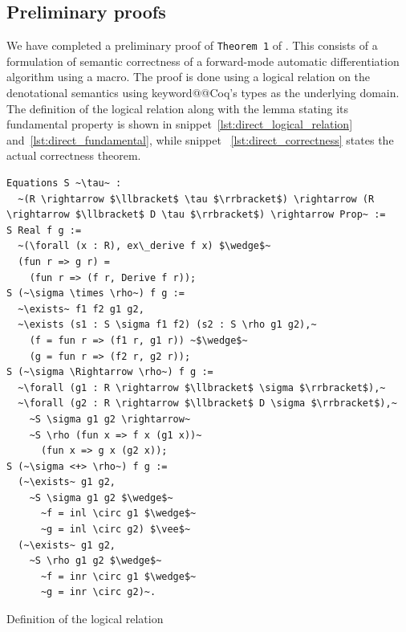\documentclass[12pt, final]{article}
\makeatletter
\def\<#1>{\csname keyword@@#1\endcsname}
\makeatother
\begin{document}
\subsection{Preliminary proofs}

We have completed a preliminary proof of \texttt{Theorem 1} of \cite{huot2020correctness}. This consists of a formulation of semantic correctness of a forward-mode automatic differentiation algorithm using a macro. The proof is done using a logical relation on the denotational semantics using \<Coq>'s types as the underlying domain. The definition of the logical relation along with the lemma stating its fundamental property is shown in snippet~\ref{lst:direct_logical_relation} and~\ref{lst:direct_fundamental}, while snippet~ \ref{lst:direct_correctness} states the actual correctness theorem.

\begin{listing}
  \begin{verbatim}
Equations S ~\tau~ :
  ~(R \rightarrow $\llbracket$ \tau $\rrbracket$) \rightarrow (R \rightarrow $\llbracket$ D \tau $\rrbracket$) \rightarrow Prop~ :=
S Real f g :=
  ~(\forall (x : R), ex\_derive f x) $\wedge$~
  (fun r => g r) =
    (fun r => (f r, Derive f r));
S (~\sigma \times \rho~) f g :=
  ~\exists~ f1 f2 g1 g2,
  ~\exists (s1 : S \sigma f1 f2) (s2 : S \rho g1 g2),~
    (f = fun r => (f1 r, g1 r)) ~$\wedge$~
    (g = fun r => (f2 r, g2 r));
S (~\sigma \Rightarrow \rho~) f g :=
  ~\forall (g1 : R \rightarrow $\llbracket$ \sigma $\rrbracket$),~
  ~\forall (g2 : R \rightarrow $\llbracket$ D \sigma $\rrbracket$),~
    ~S \sigma g1 g2 \rightarrow~
    ~S \rho (fun x => f x (g1 x))~
      (fun x => g x (g2 x));
S (~\sigma <+> \rho~) f g :=
  (~\exists~ g1 g2,
    ~S \sigma g1 g2 $\wedge$~
      ~f = inl \circ g1 $\wedge$~
      ~g = inl \circ g2) $\vee$~
  (~\exists~ g1 g2,
    ~S \rho g1 g2 $\wedge$~
      ~f = inr \circ g1 $\wedge$~
      ~g = inr \circ g2)~.
  \end{verbatim}
  \caption{Definition of the logical relation}
  \label{lst:direct_logical_relation}
\end{listing}
\end{document}
